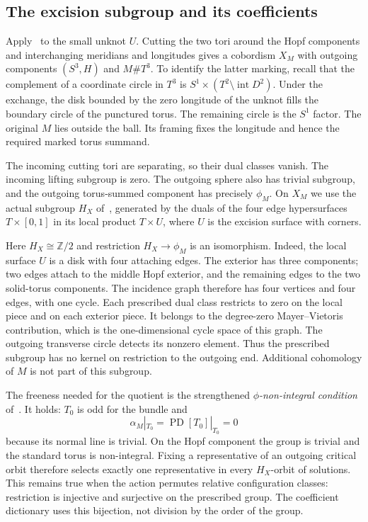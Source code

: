 \documentclass[11pt]{amsart}
\theoremstyle{definition}
\theoremstyle{remark}
\theoremstyle{plain}
\newcommand{\ZZ}{\mathbb Z}
\newcommand{\PD}{\operatorname{PD}}
\begin{document}
\subsection{The excision subgroup and its coefficients}
Apply~\cite[Proposition~5.7]{KM} to the small unknot $U$. Cutting
the two tori around the Hopf components and interchanging meridians
and longitudes gives a cobordism $X_M$ with outgoing components
$(S^3,H)$ and $M\#T^3$. To identify the latter marking, recall that
the complement of a coordinate circle in $T^3$ is
$S^1\times(T^2\setminus\operatorname{int}D^2)$. Under the exchange,
the disk bounded by the zero longitude of the unknot fills the
boundary circle of the punctured torus. The remaining circle is the
$S^1$ factor. The original $M$ lies outside the ball. Its framing
fixes the longitude and hence the required marked torus summand.

The incoming cutting tori are separating, so their dual classes
vanish. The incoming lifting subgroup is zero. The outgoing sphere
also has trivial subgroup, and the outgoing torus-summed component
has precisely $\phi_M$. On $X_M$ we use the actual subgroup $H_X$
of~\cite[Theorem~5.6]{KM}, generated by the duals of the four edge
hypersurfaces $T\times[0,1]$ in its local product $T\times U$, where
$U$ is the excision surface with corners.

Here $H_X\cong\ZZ/2$ and restriction $H_X\to\phi_M$ is an
isomorphism. Indeed, the local surface $U$ is a disk with four
attaching edges. The exterior has three components; two edges attach
to the middle Hopf exterior, and the remaining edges to the two
solid-torus components. The incidence graph therefore has four
vertices and four edges, with one cycle. Each prescribed dual class
restricts to zero on the local piece and on each exterior piece.
It belongs to the degree-zero Mayer--Vietoris contribution, which is
the one-dimensional cycle space of this graph. The outgoing transverse
circle detects its nonzero element. Thus the prescribed subgroup
has no kernel on restriction to the outgoing end. Additional
cohomology of $M$ is not part of this subgroup.

The freeness needed for the quotient is the strengthened
\emph{$\phi$-non-integral condition} of~\cite[Definition~5.1]{KM}.
It holds: $T_0$ is odd for the bundle and
\[
 \alpha_M|_{T_0}=\PD[T_0]|_{T_0}=0
\]
because its normal line is trivial. On the Hopf component the group
is trivial and the standard torus is non-integral. Fixing a
representative of an outgoing critical orbit therefore selects
exactly one representative in every $H_X$-orbit of solutions. This
remains true when the action permutes relative configuration classes:
restriction is injective and surjective on the prescribed group.
The coefficient dictionary uses this bijection, not division by the
order of the group.
\end{document}
